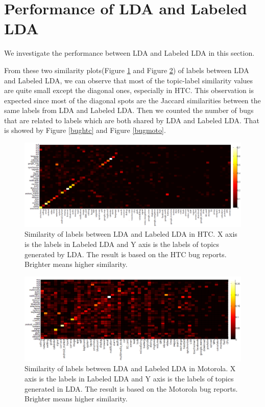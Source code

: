 \documentclass[10pt, conference, compsocconf]{IEEEtran}
\begin{document}
\section{Performance of LDA and Labeled LDA}
We investigate the performance between LDA and Labeled LDA in this section.

From these two similarity plots(Figure \ref{similarityhtc} and Figure \ref{similaritymoto}) of labels between LDA and Labeled LDA, we can observe that most of the topic-label similarity values are quite small except the diagonal ones, especially in HTC. This observation is expected since most of the diagonal spots are the Jaccard similarities between the same labels from LDA and Labeled LDA. Then we counted the number of bugs that are related to labels which are both shared by LDA and Labeled LDA. That is showed by Figure \ref{bughtc} and Figure \ref{bugmoto}.

\begin{figure}[htb]
\centering
\includegraphics[width=1\textwidth]{htcsim.png}
\caption{Similarity of labels between LDA and Labeled LDA in HTC. X axis is the labels in Labeled LDA and Y axis is the labels of topics generated by LDA. The result is based on the HTC bug reports. Brighter means higher similarity.}
\label{similarityhtc}
\end{figure}

\begin{figure}[htb]
\centering
\includegraphics[width=1\textwidth]{motosim.png}
\caption{Similarity of labels between LDA and Labeled LDA in Motorola. X axis is the labels in Labeled LDA and Y axis is the labels of topics generated in LDA. The result is based on the Motorola bug reports. Brighter means higher similarity.}
\label{similaritymoto}
\end{figure}
\end{document}
